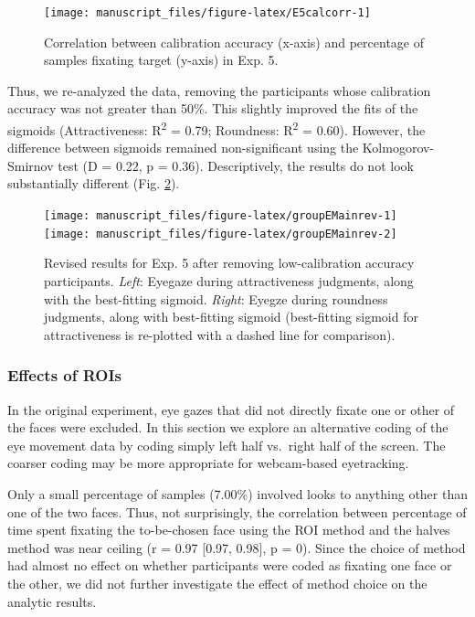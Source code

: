 \documentclass[
  man,floatsintext]{apa6}
\begin{document}
\begin{figure}
\texttt{[image: manuscript\_files/figure-latex/E5calcorr-1]} \caption{Correlation between calibration accuracy (x-axis) and percentage of samples fixating target (y-axis) in Exp. 5.}\label{fig:E5calcorr}
\end{figure}

Thus, we re-analyzed the data, removing the participants whose calibration accuracy was not greater than 50\%. This slightly improved the fits of the sigmoids (Attractiveness: R\textsuperscript{2} = 0.79; Roundness: R\textsuperscript{2} = 0.60). However, the difference between sigmoids remained non-significant using the Kolmogorov-Smirnov test (D = 0.22, p = 0.36). Descriptively, the results do not look substantially different (Fig. \ref{fig:groupEMainrev}).



\begin{figure}
\texttt{[image: manuscript\_files/figure-latex/groupEMainrev-1]} \texttt{[image: manuscript\_files/figure-latex/groupEMainrev-2]} \caption{Revised results for Exp. 5 after removing low-calibration accuracy participants. \emph{Left}: Eyegaze during attractiveness judgments, along with the best-fitting sigmoid. \emph{Right}: Eyegze during roundness judgments, along with best-fitting sigmoid (best-fitting sigmoid for attractiveness is re-plotted with a dashed line for comparison).}\label{fig:groupEMainrev}
\end{figure}

\hypertarget{effects-of-rois-2}{%
\subsubsection{Effects of ROIs}\label{effects-of-rois-2}}

In the original experiment, eye gazes that did not directly fixate one or other of the faces were excluded. In this section we explore an alternative coding of the eye movement data by coding simply left half vs.~right half of the screen. The coarser coding may be more appropriate for webcam-based eyetracking.

Only a small percentage of samples (7.00\%) involved looks to anything other than one of the two faces. Thus, not surprisingly, the correlation between percentage of time spent fixating the to-be-chosen face using the ROI method and the halves method was near ceiling (r = 0.97 {[}0.97, 0.98{]}, p = 0). Since the choice of method had almost no effect on whether participants were coded as fixating one face or the other, we did not further investigate the effect of method choice on the analytic results.
\end{document}
